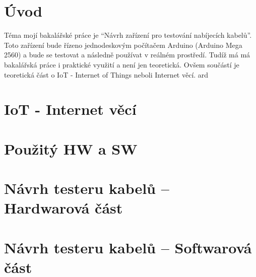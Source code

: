 \documentclass[12pt,a4paper,titlepage]{scrreprt}
\newcommand{\ardMeg}{Arduino Mega 2560}
\begin{document}
	
	
	
	\thispagestyle{empty}
	
	\thispagestyle{empty}
	
	\setcounter{page}{5}
	\printglossary
	\thispagestyle{empty}
	
	\listoffigures
	\thispagestyle{empty}
	\listoftables
	\thispagestyle{empty}

	\tableofcontents
	\thispagestyle{empty}

	
	\chapter{Úvod}
	Téma mojí bakalářské práce je “Návrh zařízení pro testování nabíjecích kabelů”. Toto zařízení bude řízeno jednodeskovým počítačem Arduino (\ardMeg) a bude se testovat a následně používat v reálném prostředí. Tudíž má má bakalářská práce i praktické využití a není jen teoretická. Ovšem součástí je teoretická část o IoT - Internet of Things neboli Internet věcí. \gls{ard}
	
	
	\chapter{IoT - Internet věcí}
	
	
	
	\chapter{Použitý HW a SW}
	
	
	
	\chapter{Návrh testeru kabelů – Hardwarová část}
	
	\chapter{Návrh testeru kabelů – Softwarová část}
	
	
\end{document}
